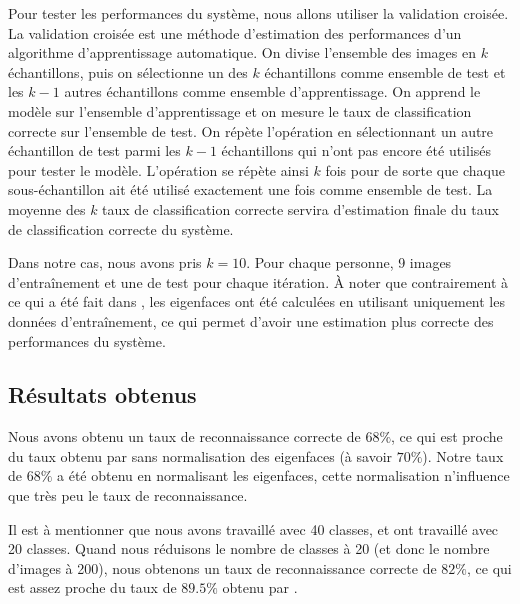 Pour tester les performances du système, nous allons utiliser la validation croisée.
La validation croisée est une méthode d’estimation des performances d'un algorithme
d'apprentissage automatique. On divise l'ensemble des images en $k$ échantillons, 
puis on sélectionne un des $k$ échantillons comme ensemble de test et les $k-1$ autres
échantillons comme ensemble d'apprentissage. On apprend le modèle sur
l'ensemble d'apprentissage et on mesure le taux de classification correcte sur l'ensemble
de test. On répète l'opération en sélectionnant un autre échantillon de test parmi les $k-1$
échantillons qui n'ont pas encore été utilisés pour tester le modèle. 
L'opération se répète ainsi $k$ fois pour de sorte que chaque sous-échantillon ait été utilisé exactement
une fois comme ensemble de test. La moyenne des $k$ taux de classification correcte servira
d'estimation finale du taux de classification correcte du système.

Dans notre cas, nous avons pris $k = 10$. Pour chaque personne,
9 images d'entraînement et une de test pour chaque itération.
À noter que contrairement à ce qui a été fait dans \cite{article},
les eigenfaces ont été calculées en utilisant uniquement les données
d'entraînement, ce qui permet d'avoir une estimation plus correcte 
des performances du système.


\subsection{Résultats obtenus}
Nous avons obtenu un taux de reconnaissance correcte de $68\%$, ce qui est proche
du taux obtenu par \cite{article} sans normalisation des eigenfaces (à savoir $70\%$).
Notre taux de $68\%$ a été obtenu en normalisant les eigenfaces, cette normalisation
n'influence que très peu le taux de reconnaissance.

Il est à mentionner que nous avons travaillé avec 40 classes, et \cite{article}
ont travaillé avec 20 classes. Quand nous réduisons le nombre de classes à 20
(et donc le nombre d'images à 200), nous obtenons un taux de reconnaissance
correcte de $82\%$, ce qui est assez proche du taux de $89.5\%$ obtenu par \cite{article}.